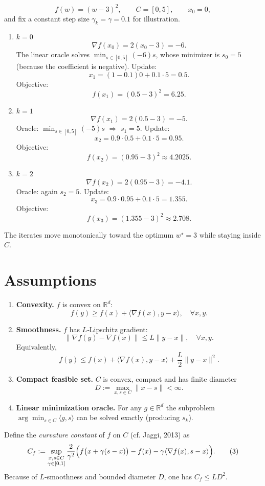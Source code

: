 \documentclass{article}
\begin{document}
\[
f(w) = (w-3)^2,\qquad C=[0,5],\qquad x_0 = 0,
\]
and fix a constant step size $\gamma_k=\gamma=0.1$ for illustration.

\begin{enumerate}[label=Iteration \arabic*:, leftmargin=*]
\item $k=0$  
\[
\nabla f(x_0)=2(x_0-3) = -6.
\]
The linear oracle solves $\min_{s\in[0,5]} (-6)s$, whose minimizer is $s_0=5$ (because the coefficient is negative).  
Update:
\[
x_1 = (1-0.1)0 + 0.1\cdot5 = 0.5.
\]
Objective:
\[
f(x_1) = (0.5-3)^2 = 6.25.
\]

\item $k=1$  
\[
\nabla f(x_1)=2(0.5-3) = -5.
\]
Oracle: $\min_{s\in[0,5]} (-5)s$ $\Rightarrow$ $s_1=5$.  
Update:
\[
x_2 = 0.9\cdot0.5 + 0.1\cdot5 = 0.95.
\]
Objective:
\[
f(x_2) = (0.95-3)^2 \approx 4.2025.
\]

\item $k=2$  
\[
\nabla f(x_2)=2(0.95-3) = -4.1.
\]
Oracle: again $s_2=5$.  
Update:
\[
x_3 = 0.9\cdot0.95 + 0.1\cdot5 = 1.355.
\]
Objective:
\[
f(x_3) = (1.355-3)^2 \approx 2.708.
\]
\end{enumerate}
The iterates move monotonically toward the optimum $w^\star=3$ while staying inside $C$.

\newpage
\section*{Assumptions}
\begin{enumerate}[label=(A\arabic*)]
\item \textbf{Convexity.} $f$ is convex on $\mathbb{R}^d$: 
\[
f(y)\ge f(x)+\langle\nabla f(x),y-x\rangle,\quad\forall x,y.
\]
\item \textbf{Smoothness.} $f$ has $L$‑Lipschitz gradient:
\[
\|\nabla f(y)-\nabla f(x)\| \le L\|y-x\|,\quad\forall x,y.
\]
Equivalently,
\[
f(y) \le f(x)+\langle\nabla f(x),y-x\rangle+\frac{L}{2}\|y-x\|^2 . \tag{A2'}
\]
\item \textbf{Compact feasible set.} $C$ is convex, compact and has finite diameter
\[
D:=\max_{x,s\in C}\|x-s\|<\infty .
\]
\item \textbf{Linear minimization oracle.} For any $g\in\mathbb{R}^d$ the subproblem 
$\arg\min_{s\in C}\langle g,s\rangle$ can be solved exactly (producing $s_k$).
\end{enumerate}

Define the \emph{curvature constant} of $f$ on $C$ (cf. Jaggi, 2013) as
\[
C_f := \sup_{\substack{x,s\in C\\ \gamma\in[0,1]}}
\frac{2}{\gamma^{2}}
\Bigl(f\bigl(x+\gamma(s-x)\bigr)-f(x)-\gamma\langle\nabla f(x),s-x\rangle\Bigr).
\tag{3}
\]
Because of $L$‑smoothness and bounded diameter $D$, one has $C_f\le L D^{2}$.
\end{document}
